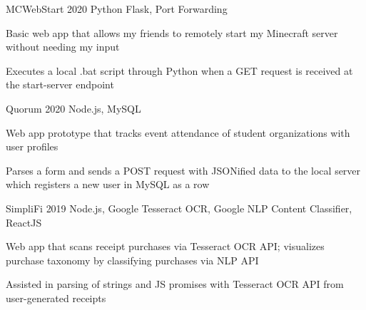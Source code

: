 
\begin{cvprojects}

  \cvproject
  {MCWebStart} %
  {\href{https://github.com/KevinIsMyName/MCWebStart}{\faGithubSquare\acvHeaderIconSep\@KevinIsMyName}} %
  {2020} %
  {Python Flask, Port Forwarding} %
  {
    \begin{cvitems}
      \item {Basic web app that allows my friends to remotely start my Minecraft server without needing my input}
      \item {Executes a local .bat script through Python when a GET request is received at the start-server endpoint}
    \end{cvitems}
  }

  \cvproject
  {Quorum}
  {\href{https://github.com/KevinIsMyName/Quorum}{\faGithubSquare\acvHeaderIconSep\@KevinIsMyName}}
  {2020}
  {Node.js, MySQL}
  {
    \begin{cvitems}
      \item {Web app prototype that tracks event attendance of student organizations with user profiles}
      \item {Parses a form and sends a POST request with JSONified data to the local server which registers a new user in MySQL as a row}
    \end{cvitems}
  }

  \cvproject
  {SimpliFi}
  {\href{https://github.com/unitehenry/simply-finance}{\faGithubSquare\acvHeaderIconSep{}}}
  {2019}
  {Node.js, Google Tesseract OCR, Google NLP Content Classifier, ReactJS}
  {
    \begin{cvitems}
      \item {Web app that scans receipt purchases via Tesseract OCR API; visualizes purchase taxonomy by classifying purchases via NLP API}
      \item {Assisted in parsing of strings and JS promises with Tesseract OCR API from user-generated receipts}
    \end{cvitems}
  }


\end{cvprojects}

